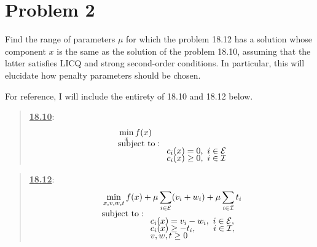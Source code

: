 \newpage
\section{Problem 2}
Find the range of parameters $\mu$ for which the problem 18.12 has a solution whose component $x$ is the same as the solution of the problem 18.10, assuming that the latter satisfies LICQ and strong second-order conditions. In particular, this will elucidate how penalty parameters should be chosen. 
\partbreak
\begin{solution}

    For reference, I will include the entirety of 18.10 and 18.12 below.
    \quotebreak
    \vspace{-9mm}
    \begin{multicols}{2}
    \begin{quote}
        \underline{\textbf{18.10}}:
        \begin{align*}
            & \min_x f(x)                \\[-1.5ex]
            &\text{subject to}:                     \\[-1.5ex]
            &\hspace{20mm} c_i(x) = 0, \ i \in \scE \\[-1.5ex]
            &\hspace{20mm} c_i(x) \geq 0, \ i \in \scI
        \end{align*}
    \end{quote}
    \columnbreak
    \begin{quote}
        \underline{\textbf{18.12}}:
        \begin{align*}
            & \min_{x, v, w, t} f(x) + \mu \sum_{i \in \scE}(v_i + w_i) + \mu \sum_{i \in \scI} t_i        \\[-1.5ex]
            &\text{subject to}: \\[-1.5ex]
            &\hspace{20mm} c_i(x) = v_i - w_i, \ i \in \scE, \\[-1.5ex]
            &\hspace{20mm} c_i(x) \geq -t_i, \hspace{7mm} i \in \scI, \\[-1.5ex]
            &\hspace{20mm} v, w, t \geq 0
        \end{align*}
    \end{quote}
    \end{multicols}
    \vspace{-12mm}\quotebreak


\end{solution}
